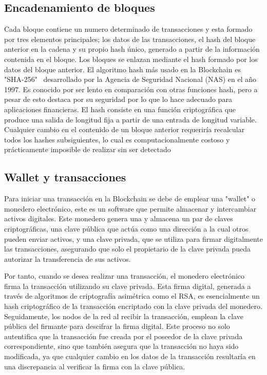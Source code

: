 

\subsection{Encadenamiento de bloques}

Cada bloque contiene un numero determinado de transacciones y esta formado por tres elementos principales; los datos de las transacciones, el hash del bloque anterior en la cadena  y su propio hash único, generado a partir de la información contenida en el bloque.
Los bloques se enlazan mediante el hash formado por los datos del bloque anterior.
El algoritmo hash más usado en la Blockchain es "SHA-256"~\cite{sha256} desarrollado por la Agencia de Seguridad Nacional (NAS) en el año 1997. Es conocido por ser lento en comparación con otras funciones hash, pero a pesar de esto destaca por su seguridad por lo que lo hace adecuado para aplicaciones financieras.
El hash consiste en una función criptográfica que produce una salida de longitud fija a partir de una entrada de longitud variable. Cualquier cambio en el contenido de un bloque anterior requeriría recalcular todos los hashes subsiguientes, lo cual es computacionalmente costoso y prácticamente imposible de realizar sin ser detectado



\subsection{Wallet y transacciones}

Para iniciar una transacción en la Blockchain se debe de emplear una "wallet" o monedero electrónico, este es un software que permite almacenar y intercambiar activos digitales.
Este monedero genera una y almacena un par de claves criptográficas, una clave pública que actúa como una dirección a la cual otros pueden enviar activos, y una clave privada, que se utiliza para firmar digitalmente las transacciones, asegurando que solo el propietario de la clave privada pueda autorizar la transferencia de sus activos.

Por tanto, cuando se desea realizar una transacción, el monedero electrónico firma la transacción utilizando su clave privada. Esta firma digital, generada a través de algoritmos de criptografía asimétrica como el RSA, es esencialmente un hash criptográfico de la transacción encriptado con la clave privada del monedero.
Seguidamente, los nodos de la red al recibir la transacción, emplean la clave pública del firmante para descifrar la firma digital. Este proceso no solo autentifica que la transacción fue creada por el poseedor de la clave privada correspondiente, sino que también asegura que la transacción no haya sido modificada, ya que cualquier cambio en los datos de la transacción resultaría en una discrepancia al verificar la firma con la clave pública.


